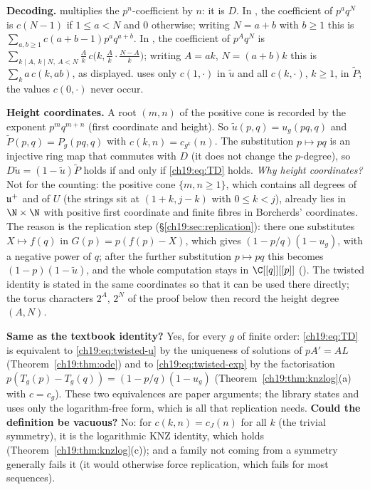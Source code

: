 \begin{dictionary}
\textbf{Decoding.}   multiplies the $p^n$-coefficient by $n$: it is $D$.  In ,
the coefficient of $p^aq^N$ is $c(N-1)$ if $1\le a<N$ and $0$ otherwise; writing $N=a+b$ with $b\ge1$ this is
$\sum_{a,b\ge1}c(a+b-1)p^aq^{a+b}$.  In , the coefficient of $p^Aq^N$ is
$\sum_{k\mid A,\ k\mid N,\ A<N}\frac Ak\,c\bigl(k,\frac Ak\cdot\frac{N-A}k\bigr)$; writing $A=ak$, $N=(a+b)k$ this is
$\sum_k a\,c(k,ab)$, as displayed.   uses only $c(1,\cdot)$ in $\tilde u$ and all
$c(k,\cdot)$, $k\ge1$, in $\tilde P$; the values $c(0,\cdot)$ never occur.

\textbf{Height coordinates.}  A root $(m,n)$ of the positive cone is recorded by the exponent $p^mq^{m+n}$ (first
coordinate and height).  So $\tilde u(p,q)=u_g(pq,q)$ and $\tilde P(p,q)=P_g(pq,q)$ with $c(k,n)=c_{g^k}(n)$.  The substitution
$p\mapsto pq$ is an injective ring map that commutes with $D$ (it does not change the $p$-degree), so
$D\tilde u=(1-\tilde u)\tilde P$ holds if and only if \eqref{ch19:eq:TD} holds.  \emph{Why height coordinates?}  Not for the
counting: the positive cone $\{m,n\ge1\}$, which contains all degrees of $\mathfrak{u}^+$ and of $U$ (the strings sit at $(1+k,j-k)$
with $0\le k<j$), already lies in $\N\times\N$ with positive first coordinate and finite fibres in Borcherds' coordinates.  The reason
is the replication step (\S\ref{ch19:sec:replication}): there one substitutes $X\mapsto f(q)$ in $G(p)=p(f(p)-X)$, which gives
$(1-p/q)(1-u_g)$, with a negative power of $q$; after the further substitution $p\mapsto pq$ this becomes $(1-p)(1-\tilde u)$, and the
whole computation stays in $\C[[q]][[p]]$ ().  The twisted identity is stated in the same
coordinates so that it can be used there directly; the torus characters $2^{A}$, $2^{N}$ of the proof below then record the
height degree $(A,N)$.

\textbf{Same as the textbook identity?}  Yes, for every $g$ of finite order: \eqref{ch19:eq:TD} is equivalent to
\eqref{ch19:eq:twisted-u} by the uniqueness of solutions of $pA'=AL$ (Theorem~\ref{ch19:thm:ode}) and to
\eqref{ch19:eq:twisted-exp} by the factorisation $p(T_g(p)-T_g(q))=(1-p/q)(1-u_g)$ (Theorem~\ref{ch19:thm:knzlog}(a) with
$c=c_g$).  These two equivalences are paper arguments; the library states and uses only the logarithm-free form, which is
all that replication needs.  \textbf{Could the definition be vacuous?}  No: for $c(k,n)=c_J(n)$ for all $k$ (the trivial
symmetry), it is the logarithmic KNZ identity, which holds (Theorem~\ref{ch19:thm:knzlog}(c)); and a family not coming from a
symmetry generally fails it (it would otherwise force replication, which fails for most sequences).
\end{dictionary}
